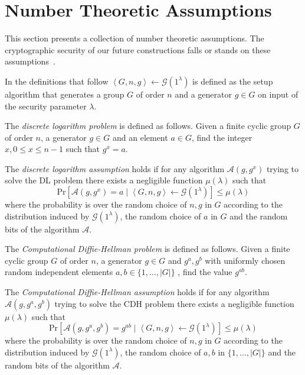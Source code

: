 \section{Number Theoretic Assumptions}
\label{sec:number_theoretic_assumptions}
This section presents a collection of number theoretic assumptions. The cryptographic security of our future constructions falls or stands on these assumptions~\cite{art:Boneh98,book:handbook_of_applied_cryptography}.

In the definitions that follow $\left< G, n, g \right> \leftarrow \mathcal{G} \left( 1^{\lambda} \right)$ is defined as the setup algorithm that generates a group $G$ of order $n$ and a generator $g \in G$ on input of the security parameter $\lambda$.

\begin{defn}[DL]
\label{def:dl}
The \textit{discrete logarithm problem} is defined as follows. Given a finite cyclic group $G$ of order $n$, a generator $g \in G$ and an element $a \in G$, find the integer $x, 0 \leq x \leq n-1$ such that $g^x = a$.

The \textit{discrete logarithm assumption} holds if for any algorithm $\mathcal{A} \left( g, g^x \right)$ trying to solve the DL problem there exists a negligible function $\mu \left( \lambda \right)$ such that 
 \begin{equation*}
  \textrm{Pr} \left[ \mathcal{A} \left( g, g^x \right) = a \mid \left< G, n, g \right> \leftarrow \mathcal{G} \left( 1^{\lambda} \right)\right] \leq \mu \left( \lambda \right)
 \end{equation*}
 where the probability is over the random choice of $n, g$ in $G$ according to the distribution induced by $\mathcal{G} \left( 1^{\lambda} \right)$, the random choice of $a$ in $G$ and the random bits of the algorithm $\mathcal{A}$.
\end{defn}


\begin{defn}[CDH]
\label{def:cdh}
The \textit{Computational Diffie-Hellman problem} is defined as follows. Given a finite cyclic group $G$ of order $n$, a generator $g \in G$ and $g^a, g^b$ with uniformly chosen random independent elements $a, b \in \{ 1, \ldots, | G |\}$ , find the value $g^{ab}$.


The \textit{Computational Diffie-Hellman assumption} holds if for any algorithm $\mathcal{A} \left( g, g^a, g^b \right)$ trying to solve the CDH problem there exists a negligible function $\mu \left( \lambda \right)$ such that 
 \begin{equation*}
  \textrm{Pr} \left[ \mathcal{A} \left( g, g^a, g^b \right) = g^{ab} \mid \left< G, n, g \right> \leftarrow \mathcal{G} \left( 1^{\lambda} \right)\right] \leq \mu \left( \lambda \right)
 \end{equation*}
 where the probability is over the random choice of $n, g$ in $G$ according to the distribution induced by $\mathcal{G} \left( 1^{\lambda} \right)$, the random choice of $a, b$ in $\{ 1, \ldots, | G |\}$ and the random bits of the algorithm $\mathcal{A}$.
\end{defn}


